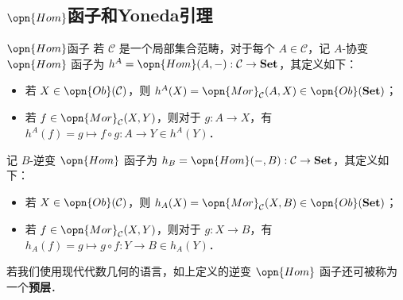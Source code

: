 \subsection{$\opn{Hom}$函子和Yoneda引理}
\begin{definition}{$\opn{Hom}$函子}
若 $\mathcal{C}$ 是一个局部集合范畴，对于每个 $A\in\mathcal{C}$，记 $A$-协变 $\opn{Hom}$ 函子为 $h^A=\opn{Hom}(A,-):\mathcal{C}\to\mathbf{Set}$，其定义如下：
\begin{itemize}
\item 若 $X\in\opn{Ob}(\mathcal{C})$，则 $h^A(X)=\opn{Mor}_\mathcal{C}(A,X)\in\opn{Ob}(\mathbf{Set})$；
\item 若 $f\in\opn{Mor}_\mathcal{C}(X,Y)$，则对于 $g:A\to X$，有 $h^A(f)=g\mapsto f\circ g:A\to Y\in h^A(Y)$．
\end{itemize}

记 $B$-逆变 $\opn{Hom}$ 函子为 $h_B=\opn{Hom}(-,B):\mathcal{C}\to\mathbf{Set}$，其定义如下：
\begin{itemize}
\item 若 $X\in\opn{Ob}(\mathcal{C})$，则 $h_A(X)=\opn{Mor}_\mathcal{C}(X,B)\in\opn{Ob}(\mathbf{Set})$；
\item 若 $f\in\opn{Mor}_\mathcal{C}(X,Y)$，则对于 $g:X\to B$，有 $h_A(f)=g\mapsto g\circ f:Y\to B\in h_A(Y)$．
\end{itemize}
\end{definition}
若我们使用现代代数几何的语言，如上定义的逆变 $\opn{Hom}$ 函子还可被称为一个\textbf{预层}．
